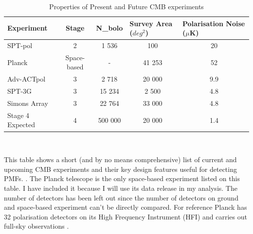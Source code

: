 \begin{table}[b]
\centering
\caption{Properties of Present and Future CMB experiments}
\label{table:future cmb}
\begin{tabular}{l|l|l|l|l}
Experiment & \multicolumn{1}{c|}{Stage} & \multicolumn{1}{c|}{N_{bolo}} & Survey Area ($deg^{2}$)& Polarisation Noise ($\mu$K) \\ \hline
SPT-pol & \multicolumn{1}{c|}{2} & \multicolumn{1}{c|}{1 536} & \multicolumn{1}{c|}{100} & \multicolumn{1}{c}{20} \\
Planck & \multicolumn{1}{c|}{Space-based} & \multicolumn{1}{c|}{-} & \multicolumn{1}{c|}{41 253} & \multicolumn{1}{c}{52} \\
Adv-ACTpol & \multicolumn{1}{c|}{3} & \multicolumn{1}{c|}{2 718} & \multicolumn{1}{c|}{20 000} & \multicolumn{1}{c}{9.9} \\
SPT-3G & \multicolumn{1}{c|}{3} & \multicolumn{1}{c|}{15 234} & \multicolumn{1}{c|}{2 500} & \multicolumn{1}{c}{4.8} \\
Simons Array & \multicolumn{1}{c|}{3} & \multicolumn{1}{c|}{22 764} & \multicolumn{1}{c|}{33 000} & \multicolumn{1}{c}{4.8} \\ 
Stage 4 Expected & \multicolumn{1}{c|}{4} & \multicolumn{1}{c|}{500 000} & \multicolumn{1}{c|}{20 000} & \multicolumn{1}{c}{1.4} \\
\end{tabular}
\\
\begin{flushleft}
This table shows a short (and by no means comprehensive) list of current and upcoming CMB experiments and their key design features useful for detecting PMFs. \cite{Henderson:2015nzj} \cite{Benson:2014qhw} \cite{Suzuki:2015zzg} \cite{Adam:2015vua}. The Planck telescope is the only space-based experiment listed on this table. I have included it because I will use its data release in my analysis. The number of detectors has been left out since the number of detectors on ground and space-based experiment can't be directly compared. For reference Planck has 32 polarisation detectors on its High Frequency Instrument (HFI) and carries out full-sky observations \cite{Lamarre:2003zh}.
\end{flushleft} 
\end{table}

